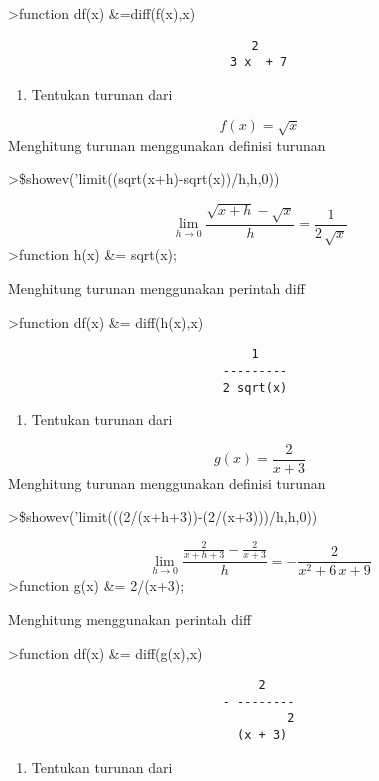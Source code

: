 \documentclass[
]{book}
\providecommand{\tightlist}{%
  \setlength{\itemsep}{0pt}\setlength{\parskip}{0pt}}
\begin{document}
\textgreater function df(x) \&=diff(f(x),x)

\begin{verbatim}
                                  2
                               3 x  + 7
\end{verbatim}

\begin{enumerate}
\def\labelenumi{\arabic{enumi}.}
\setcounter{enumi}{1}
\tightlist
\item
  Tentukan turunan dari
\end{enumerate}

\[f(x)= \sqrt x\]Menghitung turunan menggunakan definisi turunan

\textgreater\$showev('limit((sqrt(x+h)-sqrt(x))/h,h,0))

\[\lim_{h\rightarrow 0}{\frac{\sqrt{x+h}-\sqrt{x}}{h}}=\frac{1}{2\,  \sqrt{x}}\]\textgreater function h(x) \&= sqrt(x);

Menghitung turunan menggunakan perintah diff

\textgreater function df(x) \&= diff(h(x),x)

\begin{verbatim}
                                  1
                              ---------
                              2 sqrt(x)
\end{verbatim}

\begin{enumerate}
\def\labelenumi{\arabic{enumi}.}
\setcounter{enumi}{2}
\tightlist
\item
  Tentukan turunan dari
\end{enumerate}

\[g(x)= \frac {2}{x+3}\]Menghitung turunan menggunakan definisi turunan

\textgreater\$showev('limit(((2/(x+h+3))-(2/(x+3)))/h,h,0))

\[\lim_{h\rightarrow 0}{\frac{\frac{2}{x+h+3}-\frac{2}{x+3}}{h}}=-  \frac{2}{x^2+6\,x+9}\]\textgreater function g(x) \&= 2/(x+3);

Menghitung menggunakan perintah diff

\textgreater function df(x) \&= diff(g(x),x)

\begin{verbatim}
                                   2
                              - --------
                                       2
                                (x + 3)
\end{verbatim}

\begin{enumerate}
\def\labelenumi{\arabic{enumi}.}
\setcounter{enumi}{3}
\tightlist
\item
  Tentukan turunan dari
\end{enumerate}
\end{document}
